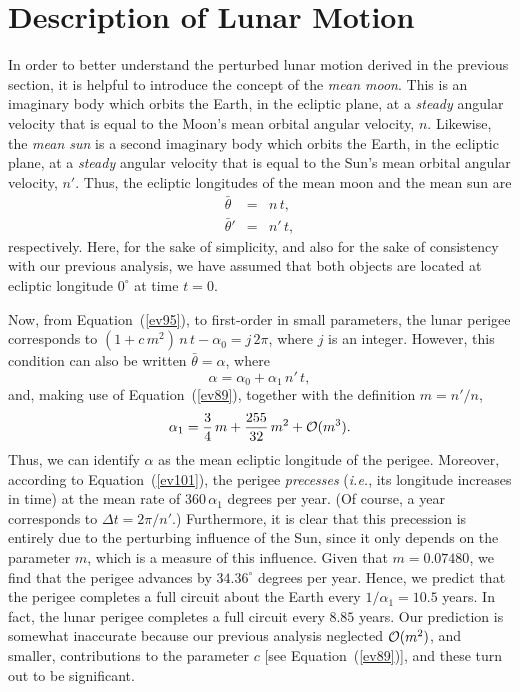  \section{Description of Lunar Motion}
 In order to better understand the perturbed lunar motion derived in the previous section, it is helpful to introduce the concept of 
 the {\em mean moon}. This is an imaginary body which orbits the Earth, in the ecliptic plane,  at a
 {\em steady}\/ angular velocity that is equal to the Moon's mean orbital angular velocity, $n$. Likewise, the
 {\em mean sun}\/ is a second imaginary body which orbits the Earth, in the ecliptic plane, at a
 {\em steady}\/ angular velocity that is equal to the Sun's mean orbital angular velocity, $n'$. Thus, the
 ecliptic longitudes of the mean moon and the mean sun are
 \begin{eqnarray}
 \bar{\theta} &=& n\,t,\\[0.5ex]
 \bar{\theta}' &=&n'\,t,
 \end{eqnarray}
 respectively. Here, for the sake of simplicity, and also for the sake of consistency with our
 previous analysis, we have assumed that both objects are located at ecliptic longitude $0^\circ$ at time $t=0$. 

 Now, from Equation~(\ref{ev95}), to first-order in small parameters, the lunar perigee corresponds  to $(1+c\,m^2)\,n\,t -\alpha_0=j\,2\pi$, where
 $j$ is an integer. 
 However, this condition can also be written $\bar{\theta}=\alpha$, where
 \begin{equation}\label{ev101}
 \alpha = \alpha_0 + \alpha_1\,n'\,t,
 \end{equation}
 and, making use of Equation~(\ref{ev89}),  together with the definition $m=n'/n$, 
 \begin{equation}
  \alpha_1 = \frac{3}{4}\,m+ \frac{255}{32}\,m^2 + {\cal O}(m^3).
  \end{equation}
  Thus, we can identify $\alpha$ as the mean ecliptic longitude of the perigee. Moreover, according to Equation~(\ref{ev101}),
   the  perigee {\em precesses}\/  ({\em i.e.},  its longitude increases  in time) at the mean  rate
  of  $360\,\alpha_1$ degrees per year. (Of course, a year corresponds to $\Delta t=2\pi/n'$.) Furthermore,  it is clear that this precession is entirely due to the perturbing influence of the Sun, since it only depends on the parameter $m$,
  which is a measure of this influence. Given that $m=0.07480$, we find that the perigee advances by
  $34.36^\circ$ degrees per year. Hence, we predict that the perigee completes a full circuit about the Earth every $1/\alpha_1 = 10.5$ years.
  In fact, the lunar perigee completes a full circuit every $8.85$ years. Our prediction is somewhat inaccurate because
  our previous analysis neglected ${\cal O}(m^2)$,  and smaller, contributions to the parameter $c$ [see Equation~(\ref{ev89})],
  and these turn out to be significant. 
  
